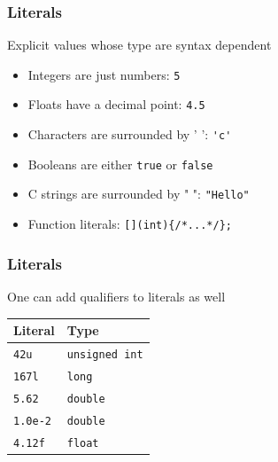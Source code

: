 \documentclass[14pt,a4paper,dvipsnames,usenames]{beamer}
\begin{document}
\begin{frame}[fragile]
  \frametitle{Literals}

  Explicit values whose type are syntax dependent

  \vspace{.5em}

  \begin{itemize}
    \setlength\itemsep{.5em}
    \item Integers are just numbers: \hspace{.25em} \lstinline!5!
    \item Floats have a decimal point: \hspace{.25em} \lstinline!4.5!
    \item Characters are surrounded by ' ': \hspace{.25em} \lstinline!'c'!
    \item Booleans are either \lstinline!true! \hspace{.1em} or \hspace{.1em} \lstinline!false!
    \item C strings are surrounded by " ": \hspace{.25em} \lstinline!"Hello"!
    \item Function literals: \lstinline![](int){/*...*/};!
  \end{itemize}

  \nointerlineskip
 
\end{frame}

\begin{frame}[fragile]
  \frametitle{Literals}

  One can add qualifiers to literals as well

  \footnotesize
  \begin{center}
    {\renewcommand{\arraystretch}{1.4}
    \begin{tabular}{|L{2cm}|L{4cm}|}\hline
      {\color{Tropiteal}Literal\strut{}} & {\color{Tropiteal}Type} \\ \hline
      \lstinline!42u! & \lstinline!unsigned int! \\
      \lstinline!167l! & \lstinline!long! \\
      \lstinline!5.62! & \lstinline!double! \\
      \lstinline!1.0e-2! & \lstinline!double! \\
      \lstinline!4.12f! & \lstinline!float! \\ \hline
    \end{tabular}
    }
  \end{center}
  
\end{frame}
\end{document}
